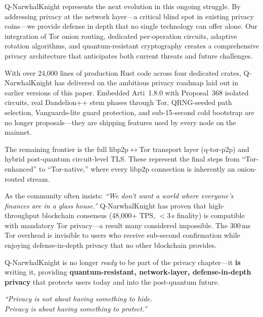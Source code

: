 \documentclass[11pt,a4paper]{article}
\begin{document}
Q-NarwhalKnight represents the next evolution in this ongoing struggle. By addressing privacy at the network layer---a critical blind spot in existing privacy coins---we provide defense in depth that no single technology can offer alone. Our integration of Tor onion routing, dedicated per-operation circuits, adaptive rotation algorithms, and quantum-resistant cryptography creates a comprehensive privacy architecture that anticipates both current threats and future challenges.

With over 24,000 lines of production Rust code across four dedicated crates, Q-NarwhalKnight has delivered on the ambitious privacy roadmap laid out in earlier versions of this paper. Embedded Arti~1.8.0 with Proposal~368 isolated circuits, real Dandelion++ stem phases through Tor, QRNG-seeded path selection, Vanguards-lite guard protection, and sub-15-second cold bootstrap are no longer proposals---they are shipping features used by every node on the mainnet.

The remaining frontier is the full libp2p$\leftrightarrow$Tor transport layer (q-tor-p2p) and hybrid post-quantum circuit-level TLS. These represent the final steps from ``Tor-enhanced'' to ``Tor-native,'' where every libp2p connection is inherently an onion-routed stream.

As the community often insists: \textit{``We don't want a world where everyone's finances are in a glass house.''} Q-NarwhalKnight has proven that high-throughput blockchain consensus (48,000+ TPS, $<$3\,s finality) is compatible with mandatory Tor privacy---a result many considered impossible. The 300\,ms Tor overhead is invisible to users who receive sub-second confirmation while enjoying defense-in-depth privacy that no other blockchain provides.

Q-NarwhalKnight is no longer \textit{ready} to be part of the privacy chapter---it \textbf{is} writing it, providing \textbf{quantum-resistant, network-layer, defense-in-depth privacy} that protects users today and into the post-quantum future.

\vspace{1cm}
\begin{center}
\textit{``Privacy is not about having something to hide.\\Privacy is about having something to protect.''}
\end{center}

\end{document}
